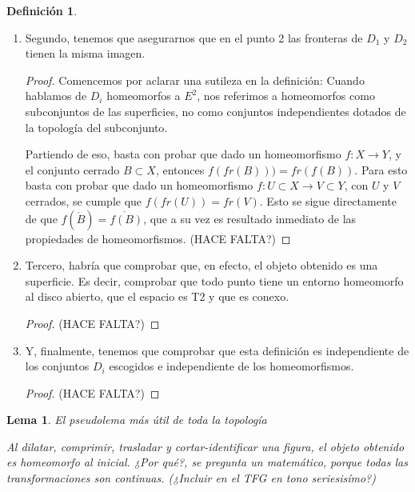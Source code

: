 \documentclass[a4paper,11pt,spanish, twoside, leqno]{tfg-uam}
\newtheorem{lema}[teor]{Lema}
\theoremstyle{definition}
\newtheorem{defin}[teor]{Definici\'on}
\begin{document}
\begin{defin}
\begin{enumerate}
\begin{proof}
			Tomamos $E_{\frac{1}{2}}$ el disco cerrado de radio $\frac{1}{2}$, y $U'= g^{-1}(E_{\frac{1}{2}})$. Tenemos que $g\mid_{U'}$ es un homeomorfismo de un subconjunto de $S_i$ a $E_{\frac{1}{2}}$ que a su vez es homeomorfo al disco cerrado de radio 1. (HACE FALTA?)
		\end{proof} 
		\item 
		Segundo, tenemos que asegurarnos que en el punto 2 las fronteras de $D_1$ y $D_2$ tienen la misma imagen.
		\begin{proof}
			Comencemos por aclarar una sutileza en la definición: Cuando hablamos de $D_i$ homeomorfos a $E^2$, nos referimos a homeomorfos como subconjuntos de las superficies, no como conjuntos independientes dotados de la topología del subconjunto.
			
			Partiendo de eso, basta con probar que dado un homeomorfismo $f: X\longrightarrow Y$, y el conjunto cerrado $B\subset X$, entonces $f(fr(B)))= fr(f(B))$.
			Para esto basta con probar que dado un homeomorfismo $f: U\subset X \longrightarrow V\subset Y$, con $U$ y $V$ cerrados, se cumple que $f(fr(U)) = fr(V)$. Esto se sigue directamente de que $f(\mathring{B})=\mathring{f(B)}$, que a su vez es resultado inmediato de las propiedades de homeomorfismos. (HACE FALTA?)
		\end{proof}
		\item 
		Tercero, habría que comprobar que, en efecto, el objeto obtenido es una superficie. Es decir, comprobar que todo punto tiene un entorno homeomorfo al disco abierto, que el espacio es T2 y que es conexo.
		\begin{proof}
			
			(HACE FALTA?)
		\end{proof}
		\item 
		Y, finalmente, tenemos que comprobar que esta definición es independiente de los conjuntos $D_i$ escogidos e independiente de los homeomorfismos.
		\begin{proof}
			(HACE FALTA?)
		\end{proof}
	\end{enumerate} 
\end{defin}

\begin{lema}{El pseudolema más útil de toda la topología}
	
	Al dilatar, comprimir, trasladar y cortar-identificar una figura, el objeto obtenido es homeomorfo al inicial. ¿Por qué?, se pregunta un matemático, porque todas las transformaciones son continuas. (¿Incluir en el TFG en tono seriesisímo?) 
\end{lema}
\end{document}
